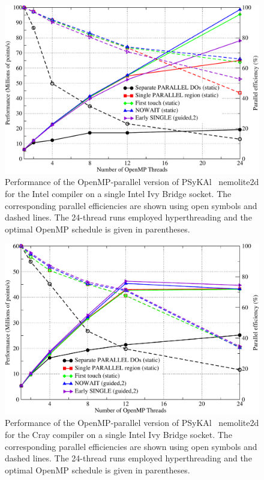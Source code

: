 \documentclass[journal]{IEEEtran}
\newlength{\picwidth}
\newcommand{\psykal}{{PS}y{KA}l\ }
\begin{document}
\begin{figure}
\centering
\includegraphics[width=\picwidth]{omp_scaling_256_intel}
\caption{Performance of the OpenMP-parallel version of \psykal
  nemolite2d for the Intel compiler on a single Intel Ivy Bridge
  socket.  The corresponding parallel efficiencies are shown using
  open symbols and dashed lines. The 24-thread runs employed
  hyperthreading and the optimal OpenMP schedule is given in
  parentheses.}
\label{FIG_intel_omp_256}
\end{figure}

\begin{figure}
\centering
\includegraphics[width=\picwidth]{omp_scaling_256_cray}
\caption{Performance of the OpenMP-parallel version of \psykal
  nemolite2d for the Cray compiler on a single Intel Ivy Bridge
  socket.  The corresponding parallel efficiencies are shown using
  open symbols and dashed lines. The 24-thread runs employed
  hyperthreading and the optimal OpenMP schedule is given in
  parentheses.}
\label{FIG_cray_omp_256}
\end{figure}
\end{document}
